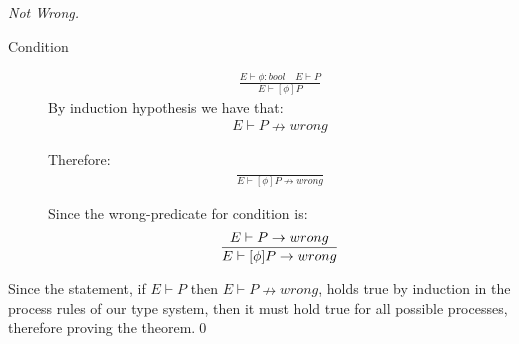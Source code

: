 \begin{proof}[Not Wrong]
\begin{description}
		
		
	\item[Condition]
		\begin{align*}
		\frac{E \vdash \phi : bool \quad E \vdash P}{E \vdash [\phi]P}
		\end{align*}
		By induction hypothesis we have that:
		\begin{align*}
		E \vdash P \nrightarrow wrong
		\end{align*}
		
		Therefore:
		\begin{align*}
		\frac{}{E \vdash [\phi ]P \nrightarrow wrong}
		\end{align*}
		
		Since the wrong-predicate for condition is:
		\begin{align*}
		\frac{E \vdash P \rightarrow wrong}{E \vdash [\phi ]P \rightarrow wrong}
		\end{align*}
	\end{description}
	Since the statement, if $E \vdash P$ then $E \vdash P \nrightarrow wrong$, holds true by induction in the process rules of our type system, then it must hold true for all possible processes, therefore proving the theorem.\qed
\end{proof}
